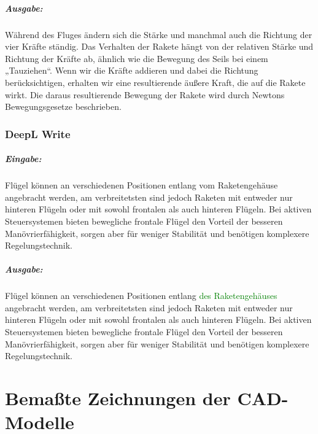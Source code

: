 \paragraph{Ausgabe:}
Während des Fluges ändern sich die Stärke und manchmal auch die Richtung der vier Kräfte ständig. Das Verhalten der Rakete hängt von der relativen Stärke und Richtung der Kräfte ab, ähnlich wie die Bewegung des Seils bei einem „Tauziehen“. Wenn wir die Kräfte addieren und dabei die Richtung berücksichtigen, erhalten wir eine resultierende äußere Kraft, die auf die Rakete wirkt. Die daraus resultierende Bewegung der Rakete wird durch Newtons Bewegungsgesetze beschrieben.

\subsection{DeepL Write}
\label{subsec:deepl_write}
\paragraph{Eingabe:}
Flügel können an verschiedenen Positionen entlang vom Raketengehäuse angebracht werden, am verbreitetsten sind jedoch Raketen mit entweder nur hinteren Flügeln oder mit sowohl frontalen als auch hinteren Flügeln. Bei aktiven Steuersystemen bieten bewegliche frontale Flügel den Vorteil der besseren Manövrierfähigkeit, sorgen aber für weniger Stabilität und benötigen komplexere Regelungstechnik.

\paragraph{Ausgabe:}
Flügel können an verschiedenen Positionen entlang \textcolor{green}{des Raketengehäuses} angebracht werden, am verbreitetsten sind jedoch Raketen mit entweder nur hinteren Flügeln oder mit sowohl frontalen als auch hinteren Flügeln. Bei aktiven Steuersystemen bieten bewegliche frontale Flügel den Vorteil der besseren Manövrierfähigkeit, sorgen aber für weniger Stabilität und benötigen komplexere Regelungstechnik.

\chapter{Bemaßte Zeichnungen der CAD-Modelle}
\label{ch:cad_drafts}


% 

